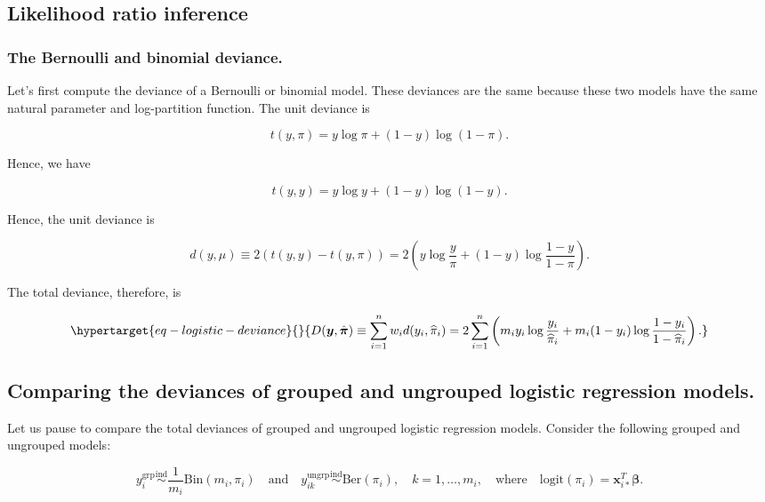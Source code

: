 \documentclass[
  11pt,
  letterpaper,
  oneside]{book}
\theoremstyle{definition}
\theoremstyle{plain}
\theoremstyle{plain}
\theoremstyle{plain}
\theoremstyle{remark}
\begin{document}
\hypertarget{sec-likelihood-ratio-inference}{%
\subsection{Likelihood ratio
inference}\label{sec-likelihood-ratio-inference}}

\hypertarget{sec-bernoulli-binomial-deviance}{%
\subsubsection{The Bernoulli and binomial
deviance.}\label{sec-bernoulli-binomial-deviance}}

Let's first compute the deviance of a Bernoulli or binomial model. These
deviances are the same because these two models have the same natural
parameter and log-partition function. The unit deviance is

\[
t(y, \pi) = y \log \pi + (1-y)\log(1-\pi).
\]

Hence, we have

\[
t(y, y) = y \log y + (1-y) \log(1-y).
\]

Hence, the unit deviance is

\[
d(y, \mu) \equiv 2(t(y,y)-t(y,\pi)) = 2\left(y \log \frac{y}{\pi} + (1-y)\log \frac{1-y}{1-\pi}\right).
\]

The total deviance, therefore, is

\begin{equation}\protect\hypertarget{eq-logistic-deviance}{}{
D(\boldsymbol y, \hat{\boldsymbol \pi}) \equiv \sum_{i = 1}^n w_i d(y_i, \widehat \pi_i) = 2\sum_{i = 1}^n \left(m_i y_i \log \frac{y_i}{\widehat \pi_i} + m_i(1-y_i) \log\frac{1-y_i}{1-\widehat \pi_i}\right).
}\label{eq-logistic-deviance}\end{equation}

\hypertarget{sec-comparing-deviances}{%
\subsection{Comparing the deviances of grouped and ungrouped logistic
regression models.}\label{sec-comparing-deviances}}

Let us pause to compare the total deviances of grouped and ungrouped
logistic regression models. Consider the following grouped and ungrouped
models:

\[
y^{\text{grp}}_i \overset{\text{ind}} \sim \frac{1}{m_i}\text{Bin}(m_i, \pi_i) \quad \text{and} \quad y^{\text{ungrp}}_{ik} \overset{\text{ind}} \sim \text{Ber}(\pi_i), \quad k = 1, \dots, m_i, \quad \text{where} \quad \text{logit}(\pi_i) = \boldsymbol x_{i*}^T \boldsymbol \beta.
\]
\end{document}

